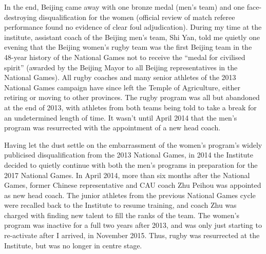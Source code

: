 \begin{CJK}{UTF8}{gbsn}
In the end, Beijing came away with one bronze medal (men's team) and one face-destroying disqualification for the women (official review of match referee performance found no evidence of clear foul adjudication).  During my time at the institute, assistant coach of the Beijing men's team, Shi Yan, told me quietly one evening that the Beijing women's rugby team was the first Beijing team in the 48-year history of the National Games not to receive the ``medal for civilised spirit''  (awarded by the Beijing Mayor to all Beijing representatives in the National Games).  All rugby coaches and many senior athletes of the 2013 National Games campaign have since left the Temple of Agriculture, either retiring or moving to other provinces.  The rugby program was all but abandoned at the end of 2013, with athletes from both teams being told to take a break for an undetermined length of time.  It wasn't until April 2014 that the men's program was resurrected with the appointment of a new head coach.

Having let the dust settle on the embarrassment of the women's program's widely publicised disqualification from the 2013 National Games, in 2014 the Institute decided to quietly continue with both the men's programs in preparation for the 2017 National Games.  In April 2014, more than six months after the National Games, former Chinese representative and CAU coach Zhu Peihou was appointed as new head coach.  The junior athletes from the previous National Games cycle were recalled back to the Institute to resume training, and coach Zhu was charged with finding new talent to fill the ranks of the team.  The women's program was inactive for a full two years after 2013, and was only just starting to re-activate after I arrived, in November 2015.  Thus, rugby was resurrected at the Institute, but was no longer in centre stage.


\end{CJK}
